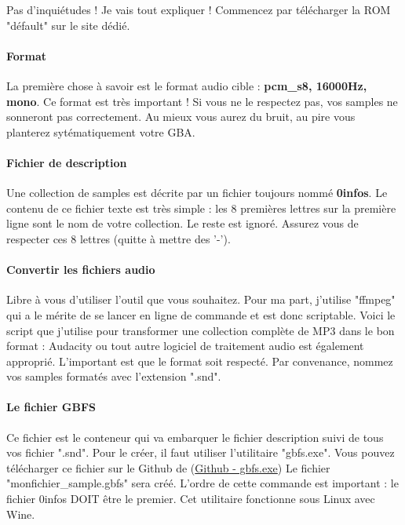 \documentclass[12pt,a4paper]{article}
\begin{document}
  Pas d'inquiétudes ! Je vais tout expliquer ! Commencez par télécharger la ROM "défault" sur le site dédié.

  \paragraph{Format} La première chose à savoir est le format audio cible : {\bf pcm\_s8, 16000Hz, mono}. Ce format est très important ! Si vous ne le respectez pas, vos samples ne sonneront pas correctement. Au mieux vous aurez du bruit, au pire vous planterez sytématiquement votre GBA.

  \paragraph{Fichier de description} Une collection de samples est décrite par un fichier toujours nommé {\bf 0infos}. Le contenu de ce fichier texte est très simple : les 8 premières lettres sur la première ligne sont le nom de votre collection. Le reste est ignoré. Assurez vous de respecter ces 8 lettres (quitte à mettre des '-').

  \paragraph{Convertir les fichiers audio} Libre à vous d'utiliser l'outil que vous souhaitez. Pour ma part, j'utilise "ffmpeg" qui a le mérite de se lancer en ligne de commande et est donc scriptable. Voici le script que j'utilise pour transformer une collection complète de MP3 dans le bon format :
  Audacity ou tout autre logiciel de traitement audio est également approprié. L'important est que le format soit respecté. Par convenance, nommez vos samples formatés avec l'extension ".snd".

  \paragraph{Le fichier GBFS} Ce fichier est le conteneur qui va embarquer le fichier description suivi de tous vos fichier ".snd". Pour le créer, il faut utiliser l'utilitaire "gbfs.exe". Vous pouvez télécharger ce fichier sur le Github de \FAT (\href{https://github.com/cbrouillard/furiousadvancetracker/blob/master/gbfs.exe?raw=true}{Github - gbfs.exe})
  Le fichier "monfichier\_sample.gbfs" sera créé. L'ordre de cette commande est important : le fichier 0infos DOIT être le premier. Cet utilitaire fonctionne sous Linux avec Wine.
\end{document}
